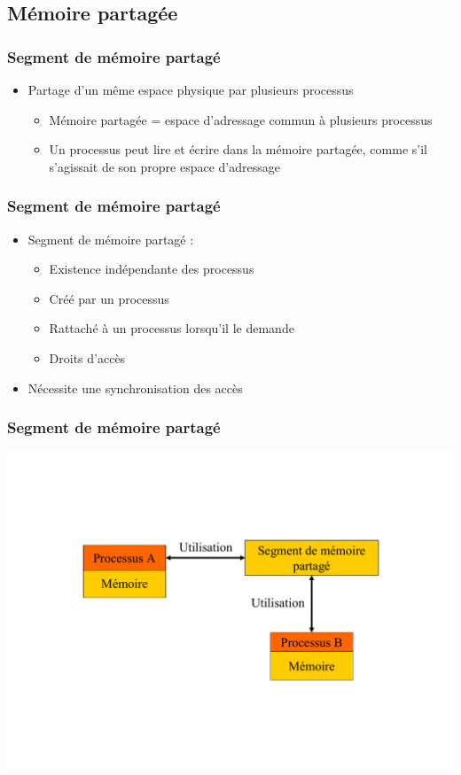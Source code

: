 \subsection{Mémoire partagée}

\begin{frame}
\frametitle{Segment de mémoire partagé}
\begin{itemize}
\item Partage d’un même espace physique par plusieurs processus
\begin{itemize}
\item Mémoire partagée = espace d’adressage commun à plusieurs processus
\item Un processus peut lire et écrire dans la mémoire partagée, comme s’il s’agissait de son propre espace d’adressage
\end{itemize}
\end{itemize}
\end{frame}

\begin{frame}
\frametitle{Segment de mémoire partagé}
\begin{itemize}
\item Segment de mémoire partagé :
\begin{itemize}
\item Existence indépendante des processus
\item Créé par un processus
\item Rattaché à un processus lorsqu’il le demande
\item Droits d’accès
\end{itemize}
\item Nécessite une synchronisation des accès
\end{itemize}
\end{frame}

\begin{frame}
\frametitle{Segment de mémoire partagé}
\includegraphics[width=.9\textwidth]{../illustration/segment_memoire_partagee.pdf}
\end{frame}

